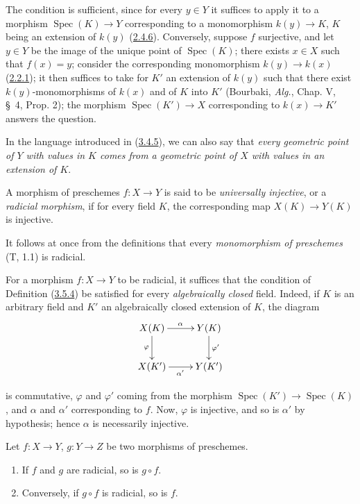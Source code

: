 The condition is sufficient, since for every $y\in Y$ it suffices to apply it
to a morphism $\operatorname{Spec}(K)\to Y$ corresponding to a monomorphism
$k(y)\to K$, $K$ being an extension of $k(y)$
(\hyperref[I.2.4.6]{2.4.6}). Conversely, suppose $f$ surjective, and let
$y\in Y$ be the image of the unique point of $\operatorname{Spec}(K)$; there
exists $x\in X$ such that $f(x)=y$; consider the corresponding monomorphism
$k(y)\to k(x)$ (\hyperref[I.2.2.1]{2.2.1}); it then suffices to take for
$K'$ an extension of $k(y)$ such that there exist $k(y)$-monomorphisms of
$k(x)$ and of $K$ into $K'$ (Bourbaki, \emph{Alg.}, Chap. V, \S~4, Prop. 2);
the morphism $\operatorname{Spec}(K')\to X$ corresponding to $k(x)\to K'$
answers the question.

In the language introduced in (\hyperref[I.3.4.5]{3.4.5}), we can also say
that \emph{every geometric point of $Y$ with values in $K$ comes
from a geometric point of $X$ with values in an extension of $K$}.

\begin{definition}[3.5.4]
\label{I.3.5.4}
A morphism of preschemes $f:X\to Y$ is said to be \emph{universally
injective}, or a \emph{radicial morphism}, if for every field $K$,
the corresponding map $X(K)\to Y(K)$ is injective.
\end{definition}

It follows at once from the definitions that every \emph{monomorphism of
preschemes} (T, 1.1) is radicial.

\begin{env}[3.5.5]
\label{I.3.5.5}
For a morphism $f:X\to Y$ to be radicial, it suffices that the condition of
Definition (\hyperref[I.3.5.4]{3.5.4}) be satisfied for every
\emph{algebraically closed} field. Indeed, if $K$ is an arbitrary field and
$K'$ an algebraically closed extension of $K$, the diagram
\label{I.3.5.5.algebraic-closure-diagram}
\[
  \xymatrix{
    X(K)\ar[r]^\alpha\ar[d]_\varphi & Y(K)\ar[d]^{\varphi'}\\
    X(K')\ar[r]_{\alpha'} & Y(K')
  }
\]

is commutative, $\varphi$ and $\varphi'$ coming from the morphism
$\operatorname{Spec}(K')\to\operatorname{Spec}(K)$, and $\alpha$ and $\alpha'$
corresponding to $f$. Now, $\varphi$ is injective, and so is
$\alpha'$ by hypothesis; hence $\alpha$ is necessarily injective.
\end{env}

\begin{proposition}[3.5.6]
\label{I.3.5.6}
Let $f:X\to Y$, $g:Y\to Z$ be two morphisms of preschemes.
\begin{enumerate}
  \item[(i)] If $f$ and $g$ are radicial, so is $g\circ f$.
  \item[(ii)] Conversely, if $g\circ f$ is radicial, so is
  $f$.
\end{enumerate}
\end{proposition}

